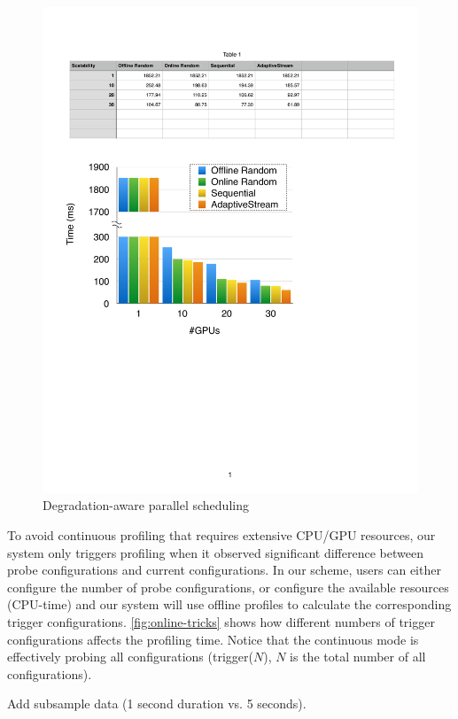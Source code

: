 \begin{figure}
  \centering
  \includegraphics[width=0.9\columnwidth]{figures/parallel-placeholder.pdf}
  \caption{Degradation-aware parallel scheduling}
  \label{fig:parallel}
\end{figure}

 To avoid continuous profiling that requires
extensive CPU/GPU resources, our system only triggers profiling when it observed
significant difference between probe configurations and current
configurations. In our scheme, users can either configure the number of probe
configurations, or configure the available resources (CPU-time) and our system
will use offline profiles to calculate the corresponding trigger configurations.
\autoref{fig:online-tricks} shows how different numbers of trigger
configurations affects the profiling time. Notice that the continuous mode is
effectively probing all configurations (trigger($N$), $N$ is the total number of
all configurations).

Add subsample data (1 second duration vs. 5 seconds).

